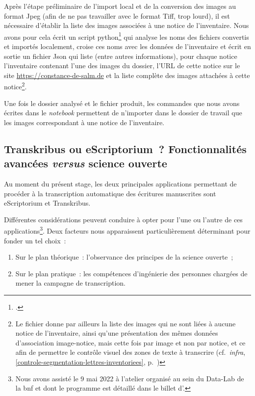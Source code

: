 \documentclass[a4paper,12pt,twoside]{book}
\begin{document}
				Après l'étape préliminaire de l'import local et de la conversion des images au format Jpeg (afin de ne pas travailler avec le format Tiff, trop lourd), il est nécessaire d'établir la liste des images associées à une notice de l'inventaire. Nous avons pour cela écrit un script python\footcite{biayDonneesImagesPy2022} qui analyse les noms des fichiers convertis et importés localement, croise ces noms avec les données de l'inventaire et écrit en sortie un fichier Json qui liste (entre autres informations), pour chaque notice l'inventaire contenant l'une des images du dossier, l'URL de cette notice sur le site \url{https://constance-de-salm.de} et la liste complète des images attachées à cette notice\footnote{Le fichier donne par ailleurs la liste des images qui ne sont liées à aucune notice de l'inventaire, ainsi qu'une présentation des mêmes données d'association image-notice, mais cette fois par image et non par notice, et ce afin de permettre le contrôle visuel des zones de texte à transcrire (cf.~\textit{infra}, \ref{controle-segmentation-lettres-inventoriees}, p.~\pageref{controle-segmentation-lettres-inventoriees})}.
				
				Une fois le dossier analysé et le fichier produit, les commandes que nous avons écrites dans le \textit{notebook} permettent de n'importer dans le dossier de travail que les images correspondant à une notice de l'inventaire.
			
						\subsection{Transkribus ou eScriptorium~? Fonctionnalités avancées \textit{versus} science ouverte}
			Au moment du présent stage, les deux principales applications permettant de procéder à la transcription automatique des écritures manuscrites sont eScriptorium et Transkribus.
			
			Différentes considérations peuvent conduire à opter pour l'une ou l'autre de ces applications\footnote{Nous avons assisté le 9 mai 2022 à l'atelier organisé au sein du Data-Lab de la \gls{bnf} et dont le programme est détaillé dans le billet d'\cite{jacquotTranskribusEScriptoriumTranscrire}.}. Deux facteurs nous apparaissent particulièrement déterminant pour fonder un tel choix~:
			
			\begin{enumerate}
				\item Sur le plan théorique~: l'observance des principes de la science ouverte~;
				\item Sur le plan pratique~: les compétences d'ingénierie des personnes chargées de mener la campagne de transcription.
			\end{enumerate}
			
\end{document}
